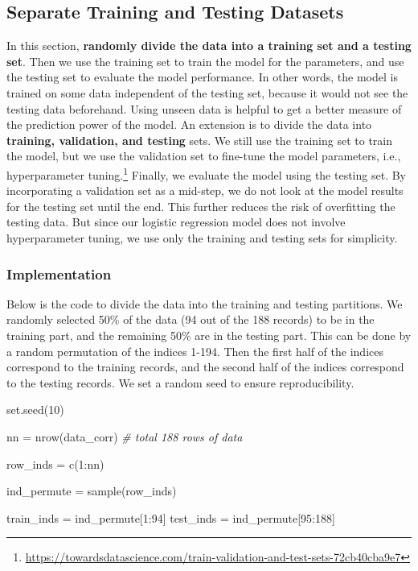 \documentclass[
]{article}
\newenvironment{Shaded}{\begin{snugshade}}{\end{snugshade}}
\newcommand{\CommentTok}[1]{\textcolor[rgb]{0.56,0.35,0.01}{\textit{#1}}}
\newcommand{\DecValTok}[1]{\textcolor[rgb]{0.00,0.00,0.81}{#1}}
\newcommand{\FunctionTok}[1]{\textcolor[rgb]{0.00,0.00,0.00}{#1}}
\newcommand{\NormalTok}[1]{#1}
\newcommand{\OtherTok}[1]{\textcolor[rgb]{0.56,0.35,0.01}{#1}}
\newcommand{\SpecialCharTok}[1]{\textcolor[rgb]{0.00,0.00,0.00}{#1}}
\begin{document}
\hypertarget{sep-train-test}{%
\subsection{Separate Training and Testing
Datasets}\label{sep-train-test}}

In this section, \textbf{randomly divide the data into a training set
and a testing set}. Then we use the training set to train the model for
the parameters, and use the testing set to evaluate the model
performance. In other words, the model is trained on some data
independent of the testing set, because it would not see the testing
data beforehand. Using unseen data is helpful to get a better measure of
the prediction power of the model. An extension is to divide the data
into \textbf{training, validation, and testing} sets. We still use the
training set to train the model, but we use the validation set to
fine-tune the model parameters, i.e., hyperparameter tuning.\footnote{\url{https://towardsdatascience.com/train-validation-and-test-sets-72cb40cba9e7}}
Finally, we evaluate the model using the testing set. By incorporating a
validation set as a mid-step, we do not look at the model results for
the testing set until the end. This further reduces the risk of
overfitting the testing data. But since our logistic regression model
does not involve hyperparameter tuning, we use only the training and
testing sets for simplicity.

\hypertarget{train-test-demo}{%
\subsubsection{Implementation}\label{train-test-demo}}

Below is the code to divide the data into the training and testing
partitions. We randomly selected 50\% of the data (94 out of the 188
records) to be in the training part, and the remaining 50\% are in the
testing part. This can be done by a random permutation of the indices
1-194. Then the first half of the indices correspond to the training
records, and the second half of the indices correspond to the testing
records. We set a random seed to ensure reproducibility.

\begin{Shaded}
\begin{Highlighting}[]
\FunctionTok{set.seed}\NormalTok{(}\DecValTok{10}\NormalTok{)}

\NormalTok{nn }\OtherTok{=} \FunctionTok{nrow}\NormalTok{(data\_corr) }\CommentTok{\# total 188 rows of data}

\NormalTok{row\_inds }\OtherTok{=} \FunctionTok{c}\NormalTok{(}\DecValTok{1}\SpecialCharTok{:}\NormalTok{nn)}

\NormalTok{ind\_permute }\OtherTok{=} \FunctionTok{sample}\NormalTok{(row\_inds) }

\NormalTok{train\_inds }\OtherTok{=}\NormalTok{ ind\_permute[}\DecValTok{1}\SpecialCharTok{:}\DecValTok{94}\NormalTok{]}
\NormalTok{test\_inds }\OtherTok{=}\NormalTok{ ind\_permute[}\DecValTok{95}\SpecialCharTok{:}\DecValTok{188}\NormalTok{]}
\end{Highlighting}
\end{Shaded}
\end{document}
